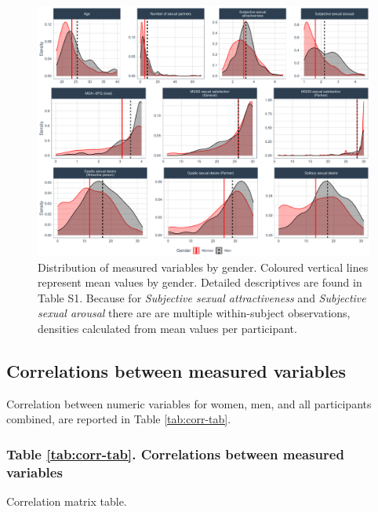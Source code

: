 \documentclass[
  bookmarksnumbered]{article}
\begin{document}
\begin{figure}
\centering
\includegraphics{Sexual_Desire_Arousal_files/figure-latex/density-plot-1.pdf}
\caption{\label{fig:density-plot}Distribution of measured variables by gender. Coloured vertical lines represent mean values by gender. Detailed descriptives are found in Table S1. Because for \emph{Subjective sexual attractiveness} and \emph{Subjective sexual arousal} there are are multiple within-subject observations, densities calculated from mean values per participant.}
\end{figure}

\subsection{Correlations between measured variables}\label{correlations-between-measured-variables}

Correlation between numeric variables for women, men, and all participants combined, are reported in Table \ref{tab:corr-tab}.

\subsubsection{Table \ref{tab:corr-tab}. Correlations between measured variables}\label{table-reftabcorr-tab.-correlations-between-measured-variables}

Correlation matrix table.
\end{document}
